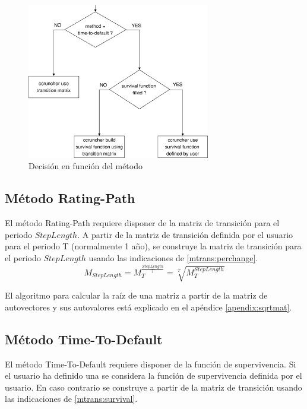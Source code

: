 \begin{figure}[!hb]
\begin{center}
\includegraphics[width=8cm,angle=0]{./images/decisiontree1.eps}
\caption{Decisi\'on en funci\'on del m\'etodo}
\label{decisiontree1}
\end{center}
\end{figure}

\subsection{M\'etodo Rating-Path}

El m\'etodo Rating-Path requiere disponer de la matriz de transici\'on
para el periodo $StepLength$. A partir de la matriz de transici\'on
definida por el usuario para el periodo T (normalmente 1 a\~no), se
construye la matriz de transici\'on para el periodo $StepLength$ usando
las indicaciones de \ref{mtrans:perchange}.
\begin{displaymath}
M_{StepLength} = M_{T}^{\frac{StepLength}{T}} = \sqrt[T]{M_{T}^{StepLength}}
\end{displaymath}

El algoritmo para calcular la ra\'iz de una matriz a partir de la matriz
de autovectores y sus autovalores est\'a explicado en el ap\'endice
\ref{apendix:sqrtmat}.

\subsection{M\'etodo Time-To-Default}

El m\'etodo Time-To-Default requiere disponer de la funci\'on de
supervivencia. Si el usuario ha definido una se considera la
funci\'on de supervivencia definida por el usuario. En caso
contrario se construye a partir de la matriz de transici\'on
usando las indicaciones de \ref{mtrans:survival}.

